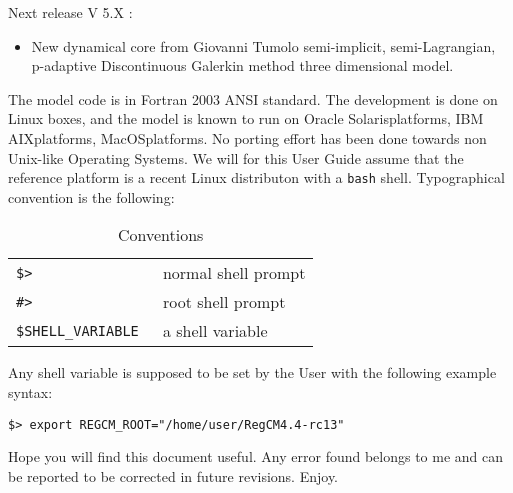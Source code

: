Next release V 5.X :

\begin{itemize}
  \item New dynamical core from Giovanni Tumolo semi-implicit, semi-Lagrangian,
   p-adaptive Discontinuous Galerkin method three dimensional model.
\end{itemize}

The model code is in Fortran 2003 ANSI standard.
The development is done on Linux boxes, and the model is known to run
on Oracle Solaris\texttrademark platforms, IBM AIX\texttrademark platforms,
MacOS\texttrademark platforms.
No porting effort has been done towards non Unix-like Operating Systems.
We will for this User Guide assume that the reference platform is a recent
Linux distributon with a \verb=bash= shell.
Typographical convention is the following:

\begin{table}[ht]
\caption{Conventions}
\vspace{0.05 in}
\centering
\begin{tabular}{l|l}
\hline
\verb=$> = & normal shell prompt \\
\verb=#> = & root shell prompt \\
\verb=$SHELL_VARIABLE = & a shell variable \\
\hline
\end{tabular}
\label{conventions}
\end{table}

Any shell variable is supposed to be set by the User with the following example
syntax:

\begin{Verbatim}
$> export REGCM_ROOT="/home/user/RegCM4.4-rc13"
\end{Verbatim}

Hope you will find this document useful. Any error found belongs to me and can
be reported to be corrected in future revisions. Enjoy.
